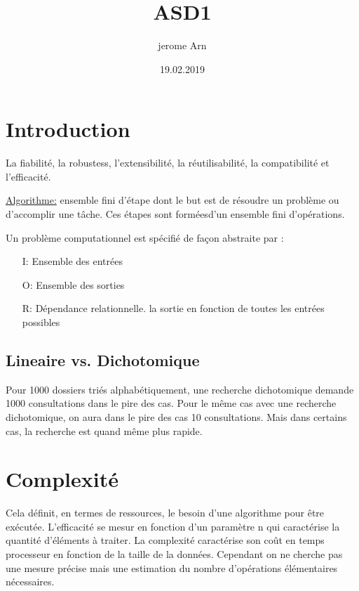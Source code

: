 \documentclass{article}
\title{ASD1}
\author{jerome Arn}
\date{19.02.2019}
\begin{document}
\maketitle
\newpage

\tableofcontents
\newpage

\section{Introduction}
La fiabilité, la robustess, l'extensibilité, la réutilisabilité, la compatibilité et l'efficacité.

\uline{Algorithme:} ensemble fini d'étape dont le but est de résoudre un problème ou d'accomplir une tâche. Ces étapes sont forméesd'un ensemble fini d'opérations. 

\newline Un problème computationnel est spécifié de façon abstraite par :
\bigskip
\begin{itemize}
	\item[I:] Ensemble des entrées 
	\item[O:] Ensemble des sorties
    	\item[R:] Dépendance relationnelle. la sortie en fonction de toutes les entrées possibles
\end{itemize}
\bigskip

\subsection{Lineaire vs. Dichotomique}
Pour 1000 dossiers triés alphabétiquement, une recherche dichotomique demande 1000 consultations dans le pire des cas. Pour le même cas avec une recherche dichotomique, on aura dans le pire des cas 10 consultations. Mais dans certains cas, la recherche est quand même plus rapide. 

\section{Complexité}
Cela définit, en termes de ressources, le besoin d'une algorithme pour être exécutée. L'efficacité se mesur en fonction d'un paramètre n qui caractérise la quantité d'éléments à traiter. La complexité caractérise son coût en temps processeur en fonction de la taille de la données. Cependant on ne cherche pas une mesure précise mais une estimation du nombre d'opérations élémentaires nécessaires. 
\end{document}
